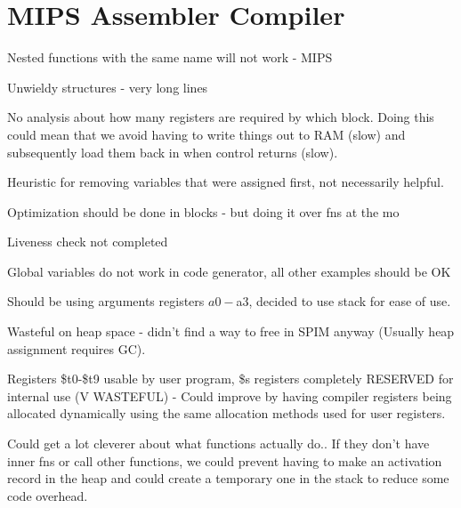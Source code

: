 \section{MIPS Assembler Compiler}
Nested functions with the same name will not work - MIPS 

Unwieldy structures - very long lines

No analysis about how many registers are required by which block. Doing this could mean that we avoid having to write things out to RAM (slow) and subsequently load them back in when control returns (slow).

Heuristic for removing variables that were assigned first, not necessarily helpful.

Optimization should be done in blocks - but doing it over fns at the mo

Liveness check not completed

Global variables do not work in code generator, all other examples should be OK


Should be using arguments registers $a0-$a3, decided to use stack for ease of use.


Wasteful on heap space - didn't find a way to free in SPIM anyway (Usually heap assignment requires GC).

Registers \$t0-\$t9 usable by user program, \$s registers completely RESERVED for internal use (V WASTEFUL) - Could improve by having compiler registers being allocated dynamically using the same allocation methods used for user registers.


Could get a lot cleverer about what functions actually do.. If they don't have inner fns or call other functions, we could prevent having to make an activation record in the heap and could create a temporary one in the stack to reduce some code overhead. 

